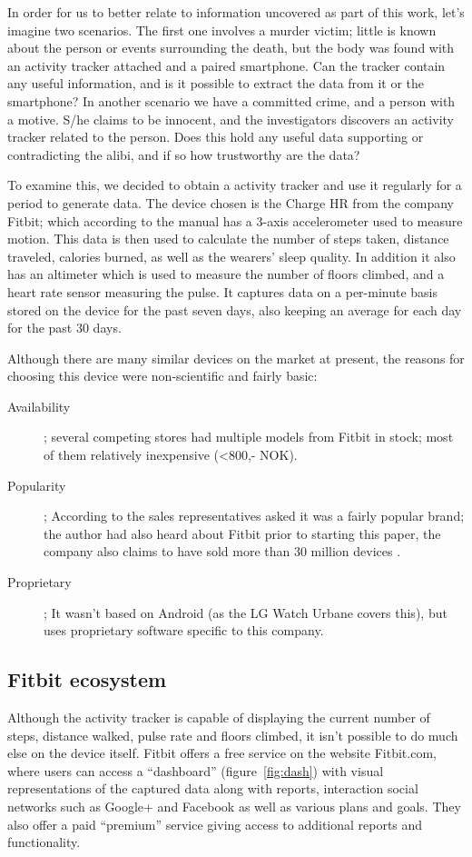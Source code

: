 \documentclass[a4paper,11pt,dvips]{article}
\begin{document}
In order for us to better relate to information uncovered as part of this work, let's imagine two scenarios. The first one involves a murder victim; little is known about the person or events surrounding the death, but the body was found with an activity tracker attached and a paired smartphone. Can the tracker contain any useful information, and is it possible to extract the data from it or the smartphone? In another scenario we have a committed crime, and a person with a motive. S/he claims to be innocent, and the investigators discovers an activity tracker related to the person. Does this hold any useful data supporting or contradicting the alibi, and if so how trustworthy are the data?

To examine this, we decided to obtain a activity tracker and use it regularly for a period to generate data. The device chosen is the Charge HR from the company Fitbit; which according to the manual has a 3-axis accelerometer used to measure motion. This data is then used to calculate the number of steps taken, distance traveled, calories burned, as well as the wearers' sleep quality. In addition it also has an altimeter which is used to measure the number of floors climbed, and a heart rate sensor measuring the pulse. It captures data on a per-minute basis stored on the device for the past seven days, also keeping an average for each day for the past 30 days.

Although there are many similar devices on the market at present, the reasons for choosing this device were non-scientific and fairly basic:

\begin{description}
\item[Availability]; several competing stores had multiple models from Fitbit in stock; most of them relatively inexpensive (<800,- NOK).
\item[Popularity]; According to the sales representatives asked it was a fairly popular brand; the author had also heard about Fitbit prior to starting this paper, the company also claims to have sold more than 30 million devices \citep{Fitbit:2015}.
\item[Proprietary]; It wasn't based on Android (as the LG Watch Urbane covers this), but uses proprietary software specific to this company.
\end{description}

\subsection{Fitbit ecosystem}
Although the activity tracker is capable of displaying the current number of steps, distance walked, pulse rate and floors climbed, it isn't possible to do much else on the device itself. Fitbit offers a free service on the website Fitbit.com, where users can access a “dashboard” (figure~\ref{fig:dash}) with visual representations of the captured data along with reports, interaction social networks such as Google+ and Facebook as well as various plans and goals. They also offer a paid “premium” service giving access to additional reports and functionality.
\end{document}
